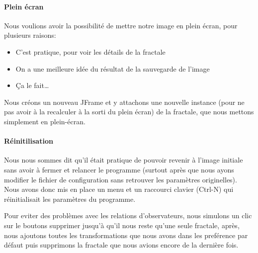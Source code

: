 \documentclass[a4paper]{article}
\begin{document}
\paragraph*{Plein écran}
Nous voulions avoir la possibilité de mettre notre image en plein écran, pour plusieurs raisons:
\begin{itemize}
\item C'est pratique, pour voir les détails de la fractale
\item On a une meilleure idée du résultat de la sauvegarde de l'image
\item Ça le fait\ldots
\end{itemize}

Nous créons un nouveau JFrame et y attachons une nouvelle instance (pour ne pas avoir à la recalculer à la sorti du plein écran) de la fractale, que nous mettons simplement en plein-écran.

\paragraph*{Réinitilisation}
Nous nous sommes dit qu'il était pratique de pouvoir revenir à l'image initiale sans avoir à fermer et relancer le programme (surtout après que nous ayons modifier le fichier de configuration sans retrouver les paramètres originelles). Nous avons donc mis en place un menu et un raccourci clavier (Ctrl-N) qui réinitialisait les paramètres du programme.

Pour eviter des problèmes avec les relations d'observateurs, nous simulons un clic sur le boutons supprimer jusqu'à qu'il nous reste qu'une seule fractale, après, nous ajoutons toutes les transformations que nous avons dans les preférence par défaut puis supprimons la fractale que nous avions encore de la dernière fois.

\subsubsection*{}

\subsubsection*{}

\subsection*{}
\end{document}
